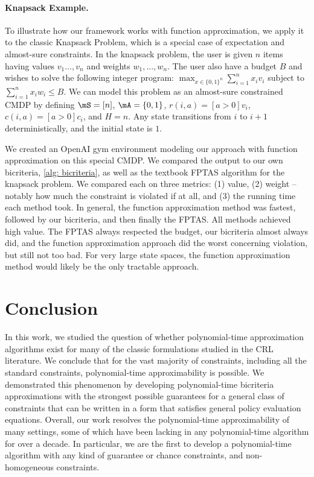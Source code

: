 \documentclass[pdftex, a4paper, 12pt]{article}
\begin{document}
\paragraph{Knapsack Example.} To illustrate how our framework works with function approximation, we apply it to the classic Knapsack Problem, which is a special case of expectation and almost-sure constraints. In the knapsack problem, the user is given $n$ items having values $v_1 \ldots, v_n$ and weights $w_1, \ldots, w_n$. The user also have a budget $B$ and wishes to solve the following integer program: $\max_{x \in \{0,1\}^n} \sum_{i = 1}^n x_i v_i$ subject to $\sum_{i = 1}^n x_i w_i \leq B$. We can model this problem as an almost-sure constrained CMDP by defining $\mS = [n]$, $\mA = \{0, 1\}$, $r(i,a) = [a > 0]v_i$, $c(i,a) = [a > 0]c_i$, and $H = n$. Any state transitions from $i$ to $i+1$ deterministically, and the initial state is $1$. 

We created an OpenAI gym environment modeling our approach with function approximation on this special CMDP. We compared the output to our own bicriteria, \cref{alg: bicriteria}, as well as the textbook FPTAS algorithm for the knapsack problem. We compared each on three metrics: (1) value, (2) weight -- notably how much the constraint is violated if at all, and (3) the running time each method took. In general, the function approximation method was fastest, followed by our bicriteria, and then finally the FPTAS. All methods achieved high value. The FPTAS always respected the budget, our bicriteria almost always did, and the function approximation approach did the worst concerning violation, but still not too bad. For very large state spaces, the function approximation method would likely be the only tractable approach.



\section{Conclusion}\label{sec: conclusion}

In this work, we studied the question of whether polynomial-time approximation algorithms exist for many of the classic formulations studied in the CRL literature. We conclude that for the vast majority of constraints, including all the standard constraints, polynomial-time approximability is possible. We demonstrated this phenomenon by developing polynomial-time bicriteria approximations with the strongest possible guarantees for a general class of constraints that can be written in a form that satisfies general policy evaluation equations. Overall, our work resolves the polynomial-time approximability of many settings, some of which have been lacking in any polynomial-time algorithm for over a decade. In particular, we are the first to develop a polynomial-time algorithm with any kind of guarantee or chance constraints, and non-homogeneous constraints. 
\end{document}

